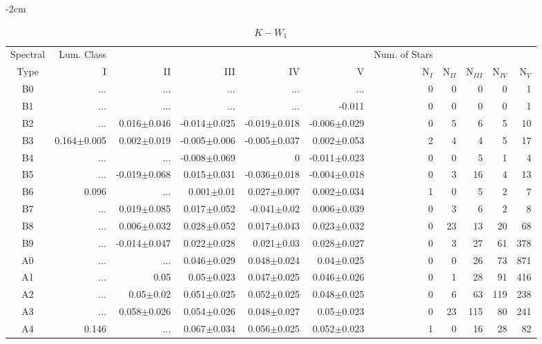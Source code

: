 \begin{table}[t]
\tiny
\centering
\caption{$K-W_{1}$}
\begin{center}
    \addtolength{\leftskip} {-2cm}
    \addtolength{\rightskip}{-2cm}
    \begin{tabular}{c|rrrrr|rrrrr}
    \toprule
    Spectral & Lum. Class & & & & & Num. of Stars & & & &  \\
    Type & I & II & III &  IV & V & N$_{I}$ & N$_{II}$ & N$_{III}$ & N$_{IV}$ & N$_{V}$ \\ \midrule

B0	&	 ...	&	 ...	&	 ...	&	 ...	&	 ...	&	0	&	0	&	0	&	0	&	1	\\
B1	&	 ...	&	 ...	&	 ...	&	 ...	&	-0.011	&	0	&	0	&	0	&	0	&	1	\\
B2	&	 ...	&	0.016$\pm$0.046	&	-0.014$\pm$0.025	&	-0.019$\pm$0.018	&	-0.006$\pm$0.029	&	0	&	5	&	6	&	5	&	10	\\
B3	&	0.164$\pm$0.005	&	0.002$\pm$0.019	&	-0.005$\pm$0.006	&	-0.005$\pm$0.037	&	0.002$\pm$0.053	&	2	&	4	&	4	&	5	&	17	\\
B4	&	 ...	&	 ...	&	-0.008$\pm$0.069	&	0	&	-0.011$\pm$0.023	&	0	&	0	&	5	&	1	&	4	\\
B5	&	 ...	&	-0.019$\pm$0.068	&	0.015$\pm$0.031	&	-0.036$\pm$0.018	&	-0.004$\pm$0.018	&	0	&	3	&	16	&	4	&	13	\\
B6	&	0.096	&	 ...	&	0.001$\pm$0.01	&	0.027$\pm$0.007	&	0.002$\pm$0.034	&	1	&	0	&	5	&	2	&	7	\\
B7	&	 ...	&	0.019$\pm$0.085	&	0.017$\pm$0.052	&	-0.041$\pm$0.02	&	0.006$\pm$0.039	&	0	&	3	&	6	&	2	&	8	\\
B8	&	 ...	&	0.006$\pm$0.032	&	0.028$\pm$0.052	&	0.017$\pm$0.043	&	0.023$\pm$0.032	&	0	&	23	&	13	&	20	&	68	\\
B9	&	 ...	&	-0.014$\pm$0.047	&	0.022$\pm$0.028	&	0.021$\pm$0.03	&	0.028$\pm$0.027	&	0	&	3	&	27	&	61	&	378	\\
A0	&	 ...	&	 ...	&	0.046$\pm$0.029	&	0.048$\pm$0.024	&	0.04$\pm$0.025	&	0	&	0	&	26	&	73	&	871	\\
A1	&	 ...	&	0.05	&	0.05$\pm$0.023	&	0.047$\pm$0.025	&	0.046$\pm$0.026	&	0	&	1	&	28	&	91	&	416	\\
A2	&	 ...	&	0.05$\pm$0.02	&	0.051$\pm$0.025	&	0.052$\pm$0.025	&	0.048$\pm$0.025	&	0	&	6	&	63	&	119	&	238	\\
A3	&	 ...	&	0.058$\pm$0.026	&	0.054$\pm$0.026	&	0.048$\pm$0.027	&	0.05$\pm$0.023	&	0	&	23	&	115	&	80	&	241	\\
A4	&	0.146	&	 ...	&	0.067$\pm$0.034	&	0.056$\pm$0.025	&	0.052$\pm$0.023	&	1	&	0	&	16	&	28	&	82	\\

\end{tabular}
\end{center}
\end{table}
